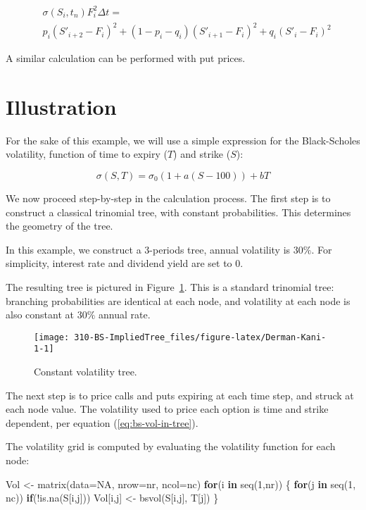 \documentclass[]{tufte-book}
\newenvironment{Shaded}{}{}
\newcommand{\AttributeTok}[1]{\textcolor[rgb]{0.49,0.56,0.16}{#1}}
\newcommand{\ConstantTok}[1]{\textcolor[rgb]{0.53,0.00,0.00}{#1}}
\newcommand{\ControlFlowTok}[1]{\textcolor[rgb]{0.00,0.44,0.13}{\textbf{#1}}}
\newcommand{\DecValTok}[1]{\textcolor[rgb]{0.25,0.63,0.44}{#1}}
\newcommand{\FunctionTok}[1]{\textcolor[rgb]{0.02,0.16,0.49}{#1}}
\newcommand{\NormalTok}[1]{#1}
\newcommand{\OtherTok}[1]{\textcolor[rgb]{0.00,0.44,0.13}{#1}}
\newcommand{\SpecialCharTok}[1]{\textcolor[rgb]{0.25,0.44,0.63}{#1}}
\begin{document}
\begin{align}
& \sigma(S_i, t_n) F_i^2 \Delta t = \nonumber \\
& p_i (S'_{i+2} - F_i)^2 + (1-p_i-q_i) (S'_{i+1} - F_i)^2 + q_i (S'_{i} - F_i)^2
\label{eq:local-vol}
\end{align}

A similar calculation can be performed with put prices.

\hypertarget{illustration}{%
\section{Illustration}\label{illustration}}

For the sake of this example, we will use a simple expression for the
Black-Scholes volatility, function of time to expiry (\(T\)) and strike (\(S\)):

\[
\sigma(S, T) = \sigma_0 (1+a(S-100)) + bT
\label{eq:bs-vol-in-tree}
\]

We now proceed step-by-step in the calculation process. The first step
is to construct a classical trinomial tree, with constant probabilities.
This determines the geometry of the tree.

In this example, we construct a 3-periods tree, annual volatility is
\(30\%\). For simplicity, interest rate and dividend yield are set to 0.

The resulting tree is pictured in Figure~\ref{fig:Derman-Kani-1}. This is
a standard trinomial tree: branching probabilities are identical at each
node, and volatility at each node is also constant at \(30\%\) annual rate.

\begin{figure}
\texttt{[image: 310-BS-ImpliedTree\_files/figure-latex/Derman-Kani-1-1]} \caption[Constant volatility tree]{Constant volatility tree.}\label{fig:Derman-Kani-1}
\end{figure}

The next step is to price calls and puts expiring at each time step, and
struck at each node value. The volatility used to price each option is
time and strike dependent, per equation (\eqref{eq:bs-vol-in-tree}).

The volatility grid is computed by evaluating the volatility function
for each node:

\begin{Shaded}
\begin{Highlighting}[]
\NormalTok{  Vol }\OtherTok{\textless{}{-}} \FunctionTok{matrix}\NormalTok{(}\AttributeTok{data=}\ConstantTok{NA}\NormalTok{, }\AttributeTok{nrow=}\NormalTok{nr, }\AttributeTok{ncol=}\NormalTok{nc)}
  \ControlFlowTok{for}\NormalTok{(i }\ControlFlowTok{in} \FunctionTok{seq}\NormalTok{(}\DecValTok{1}\NormalTok{,nr)) \{}
    \ControlFlowTok{for}\NormalTok{(j }\ControlFlowTok{in} \FunctionTok{seq}\NormalTok{(}\DecValTok{1}\NormalTok{, nc))}
      \ControlFlowTok{if}\NormalTok{(}\SpecialCharTok{!}\FunctionTok{is.na}\NormalTok{(S[i,j])) Vol[i,j] }\OtherTok{\textless{}{-}} \FunctionTok{bsvol}\NormalTok{(S[i,j], T[j])}
\NormalTok{  \}}
\end{Highlighting}
\end{Shaded}
\end{document}
